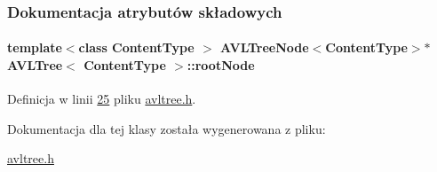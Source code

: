 \subsubsection{Dokumentacja atrybutów składowych}
\hypertarget{class_a_v_l_tree_aee3daa1b05e59d770a95e1274f09eb22}{
\paragraph[{root\-Node}]{\setlength{\rightskip}{0pt plus 5cm}template$<$class Content\-Type $>$ {\bf A\-V\-L\-Tree\-Node}$<$Content\-Type$>$$\ast$ {\bf A\-V\-L\-Tree}$<$ Content\-Type $>$\-::root\-Node}}\label{class_a_v_l_tree_aee3daa1b05e59d770a95e1274f09eb22}


Definicja w linii \hyperlink{avltree_8h_source_l00025}{25} pliku \hyperlink{avltree_8h_source}{avltree.\-h}.



Dokumentacja dla tej klasy została wygenerowana z pliku\-:\begin{DoxyCompactItemize}
\item 
\hyperlink{avltree_8h}{avltree.\-h}\end{DoxyCompactItemize}
